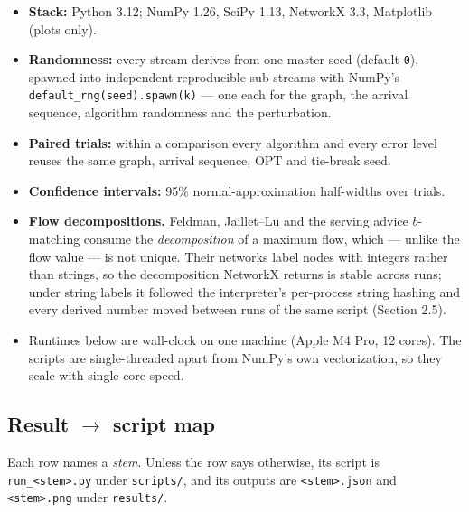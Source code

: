 \begin{itemize}
\tightlist
\item
  \textbf{Stack:} Python 3.12; NumPy 1.26, SciPy 1.13, NetworkX 3.3,
  Matplotlib (plots only).
\item
  \textbf{Randomness:} every stream derives from one master seed
  (default \texttt{0}), spawned into independent reproducible
  sub-streams with NumPy's \texttt{default\_rng(seed).spawn(k)} --- one
  each for the graph, the arrival sequence, algorithm randomness and the
  perturbation.
\item
  \textbf{Paired trials:} within a comparison every algorithm and every
  error level reuses the same graph, arrival sequence, \(\mathrm{OPT}\)
  and tie-break seed.
\item
  \textbf{Confidence intervals:} 95\% normal-approximation half-widths
  over trials.
\item
  \textbf{Flow decompositions.} Feldman, Jaillet--Lu and the serving
  advice \(b\)-matching consume the \emph{decomposition} of a maximum
  flow, which --- unlike the flow value --- is not unique. Their
  networks label nodes with integers rather than strings, so the
  decomposition NetworkX returns is stable across runs; under string
  labels it followed the interpreter's per-process string hashing and
  every derived number moved between runs of the same script (Section
  2.5).
\item
  Runtimes below are wall-clock on one machine (Apple M4 Pro, 12 cores).
  The scripts are single-threaded apart from NumPy's own vectorization,
  so they scale with single-core speed.
\end{itemize}

\subsection{\texorpdfstring{Result \ensuremath{\rightarrow} script
map}{Result  script map}}

Each row names a \emph{stem}. Unless the row says otherwise, its script
is \texttt{run\_\textless{}stem\textgreater{}.py} under
\texttt{scripts/}, and its outputs are
\texttt{\textless{}stem\textgreater{}.json} and
\texttt{\textless{}stem\textgreater{}.png} under \texttt{results/}.


